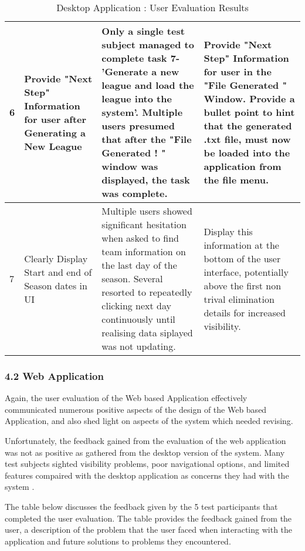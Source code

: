 \begin{table}[t]
\begin{tabular}{|l|p{3cm}|p{5cm}|p{4cm}|}
\hline
6 & Provide "Next Step" Information for user after Generating a New League   & Only a single test subject managed to complete task 7- 'Generate a new league and load the league into the system'. Multiple users presumed that after the "File Generated ! " window was displayed, the task was complete.   & Provide "Next Step" Information for user in the "File Generated " Window. Provide a bullet point to hint that the generated .txt file, must now be loaded into the application from the file menu.     \\
\hline
7 & Clearly Display Start and end of Season dates in UI   & Multiple users showed significant hesitation when asked to find team information on the last day of the season. Several resorted to repeatedly clicking next day continuously until realising data siplayed was not updating. &  Display this information at the bottom of the user interface, potentially above the first non trival elimination details for increased visibility.   \\
\hline

\hline
\end{tabular}
\caption{Desktop Application : User Evaluation Results}
\label{tab:template}
\end{table}
 	 

\subsubsection{4.2 Web Application}


Again, the user evaluation of the Web based Application effectively communicated numerous positive aspects of the design of the Web based Application, and also shed light on aspects of the system which needed revising. 

Unfortunately, the feedback gained from the evaluation of the web application was not as positive as gathered from the desktop version of the system. Many test subjects sighted visibility problems, poor navigational options, and limited features compaired with the desktop application as concerns they had with the system . 

The table below discusses the feedback given by the 5 test participants that completed the user evaluation. The table provides the feedback gained from the user, a description of the problem that the user faced when interacting with the application and future solutions to problems they encountered. 
    



